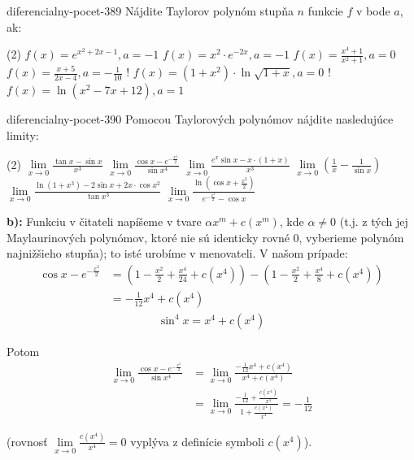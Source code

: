 \begin{defproblem}{diferencialny-pocet-389}
Nájdite Taylorov polynóm stupňa $n$ funkcie $f$ v bode $a$, ak:
\begin{tasks}(2)
  \task $f(x)=e^{x^2+2x-1},a=-1$
  \task $f(x)=x^2\cdot e^{-2x},a=-1$
  \task $f(x)=\frac{x^4+1}{x^2+1},a=0$
  \task $f(x)=\frac{x+5}{2x-4},a=-\frac{1}{10}$
  \task! $f(x)=(1+x^2)\cdot\ln\sqrt{1+x},a=0$
  \task! $f(x)=\ln (x^2-7x+12),a=1$
\end{tasks}
\end{defproblem}

\begin{defproblem}{diferencialny-pocet-390}
Pomocou Taylorových polynómov nájdite nasledujúce limity:
\begin{tasks}(2)
  \task $\lim\limits_{x \rightarrow 0}\frac{\tan x-\sin x}{x^3}$
  \task $\lim\limits_{x \rightarrow 0}\frac{\cos x-e^{-\frac{x^2}{2}}}{\sin x^4}$
  \task $\lim\limits_{x \rightarrow 0}\frac{e^x\sin x-x\cdot(1+x)}{x^3}$
  \task $\lim\limits_{x \rightarrow 0}(\frac{1}{x}-\frac{1}{\sin x})$
  \task $\lim\limits_{x \rightarrow 0}\frac{\ln (1+x^3)-2\sin x+2x\cdot\cos x^2}{\tan x^3}$
  \task $\lim\limits_{x \rightarrow 0}\frac{\ln (\cos x +\frac{x^2}{2})}{e^{-\frac{x^2}{2}}-\cos x}$
\end{tasks}

\begin{solution}
  \textbf{b):}
  Funkciu v čitateli napíšeme v tvare $\alpha x^m+c(x^m)$, kde $\alpha\neq 0$
  (t.j. z tých jej Maylaurinových polynómov, ktoré nie sú identicky rovné $0$,
  vyberieme polynóm najnižšieho stupňa); to isté urobíme v menovateli. V našom
  prípade:
  \begin{align*}
    \cos x - e^{-\frac{x^2}{2}}
      &= (1-\frac{x^2}{2}+\frac{x^4}{24}+c(x^4))-(1-\frac{x^2}{2}+\frac{x^4}{8}+c(x^4)) \\
      &= -\frac{1}{12}x^4+c(x^4)
  \end{align*}
  \begin{align*}
    \sin^4 x = x^4+c(x^4)
  \end{align*}

  Potom
  \begin{align*}
    \lim_{x \rightarrow 0}\frac{\cos x -e^{-\frac{x^2}{2}}}{\sin x^4}
      &= \lim_{x \rightarrow 0}\frac{-\frac{1}{12}x^4+c(x^4)}{x^4+c(x^4)} \\
      &= \lim_{x \rightarrow 0}\frac{{-\frac{1}{12}}+\frac{c(x^4)}{x^4}}{1+\frac{c(x^4)}{x^4}}
      = -\frac{1}{12}
  \end{align*}

  (rovnosť $\lim\limits_{x\rightarrow 0}\frac{c(x^4)}{x^4}=0$ vyplýva z definície
  symboli $c(x^4)$).

\end{solution}
\end{defproblem}

